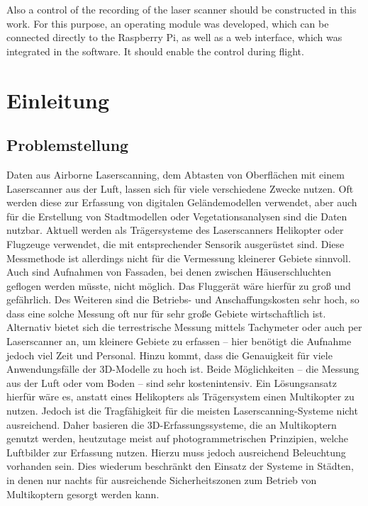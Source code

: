 \documentclass[a4paper,12pt,bibliography=totoc, listof=totoc,titlepage,pointlessnumbers]{scrreprt}
\begin{document}
Also a control of the recording of the laser scanner should be constructed in this work. For this purpose, an operating module was developed, which can be connected directly to the Rasp\-berry Pi, as well as a web interface, which was integrated in the software. It should enable the control during flight.
\providecommand{\citeTwo}[4]{\citep[{\citealp[#1]{#2};}][#3]{#4}} 
\providecommand{\citeThree}[6]{\citep[{\citealp[#1]{#2}; \citealp[#3]{#4};}][#5]{#6}} 
\providecommand{\citeFour}[8]{\citep[{\citealp[#1]{#2}; \citealp[#3]{#4}; \citealp[#5]{#6};}][#7]{#8}}

\newpage

\tableofcontents
\newpage

\setcounter{page}{1} 

\chapter{Einleitung}

\section{Problemstellung}
Daten aus Air\-borne Laser\-scan\-ning, dem Abtasten von Oberflächen mit einem Laser\-scan\-ner aus der Luft, lassen sich für viele verschiedene Zwecke nutzen. Oft werden diese zur Erfassung von digitalen Geländemodellen verwendet, aber auch für die Erstellung von Stadtmodellen oder Vegetationsanalysen sind die Daten nutzbar. Aktuell werden als Trägersysteme des Laser\-scan\-ners Helikopter oder Flugzeuge verwendet, die mit entsprechender Sensorik ausgerüstet sind. Diese Messmethode ist allerdings nicht für die Vermessung kleinerer Gebiete sinnvoll. Auch sind Aufnahmen von Fassaden, bei denen zwischen Häuserschluchten geflogen werden müsste, nicht möglich. Das Fluggerät wäre hierfür zu groß und gefährlich. Des Weiteren sind die Betriebs- und Anschaffungskosten sehr hoch, so dass eine solche Messung oft nur für sehr große Gebiete wirtschaftlich ist. Alternativ bietet sich die terrestrische Messung mittels Tachymeter oder auch per Laser\-scan\-ner an, um kleinere Gebiete zu erfassen -- hier benötigt die Aufnahme jedoch viel Zeit und Personal. Hinzu kommt, dass die Genauigkeit für viele Anwendungsfälle der 3D-Modelle zu hoch ist. Beide Mög\-lich\-keiten -- die Messung aus der Luft oder vom Boden -- sind sehr kostenintensiv. Ein Lösungsansatz hierfür wäre es, anstatt eines Helikopters als Trägersystem einen Multikopter zu nutzen. Jedoch ist die Tragfähigkeit für die meisten Laser\-scan\-ning-Systeme nicht ausreichend. Daher basieren die 3D-Erfassungssysteme, die an Multikoptern genutzt werden, heutzutage meist auf photogrammetrischen Prinzipien, welche Luftbilder zur Erfassung nutzen. Hierzu muss jedoch ausreichend Beleuchtung vorhanden sein. Dies wiederum beschränkt den Einsatz der Systeme in Städten, in denen nur nachts für ausreichende Sicherheitszonen zum Betrieb von Multikoptern gesorgt werden kann. \citep{carlos}
\end{document}
